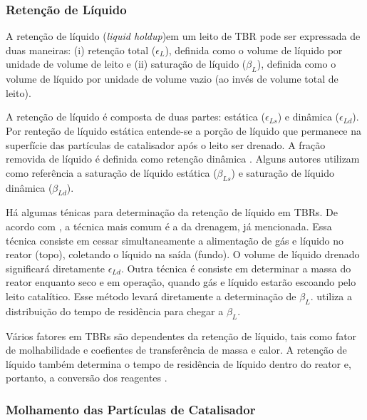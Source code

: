 \subsubsection{Retenção de Líquido}
\label{sec:retencaodeliquido}

A retenção de líquido (\emph{liquid holdup})em um leito de TBR  pode ser
expressada de duas maneiras: (i) retenção total ($\epsilon_L$), definida
como o volume de líquido por unidade de volume de leito e (ii) saturação de líquido
($\beta_L$), definida como o volume de líquido por unidade de volume vazio
(ao invés de volume total de leito). 

A retenção de líquido é composta de duas partes: estática ($\epsilon_{Ls}$) e
dinâmica ($\epsilon_{Ld}$). Por renteção de líquido estática entende-se a porção
de líquido que permanece na superfície das partículas de catalisador após o
leito ser drenado. A fração removida de líquido é definida como retenção
dinâmica \cite{Ranade2011}. Alguns autores utilizam como referência a saturação
de líquido estática ($\beta_{Ls}$) e saturação de líquido dinâmica ($\beta_{Ld}$).

Há algumas ténicas para determinação da retenção de líquido em TBRs. De acordo
com \cite{Benkrid1997}, a técnica mais comum é a da drenagem, já mencionada.
Essa técnica consiste em cessar simultaneamente a alimentação de gás e líquido
no reator (topo), coletando o líquido na saída (fundo). O volume de líquido
drenado significará diretamente $\epsilon_{Ld}$. Outra técnica é consiste em
determinar a massa do reator enquanto seco e em operação, quando gás e líquido
estarão escoando pelo leito catalítico. Esse método levará diretamente a
determinação de $\beta_L$. \cite{Larachi1991} utiliza a distribuição do tempo de
residência para chegar a $\beta_L$.

Vários fatores em TBRs são dependentes da retenção de líquido, tais como fator
de molhabilidade e coefientes de transferência de massa e calor. A retenção de
líquido também determina o tempo de residência de líquido dentro do reator e,
portanto, a conversão dos reagentes \cite{Ranade2011}.


\subsubsection{Molhamento das Partículas de Catalisador}
\label{sec:molhamento}

